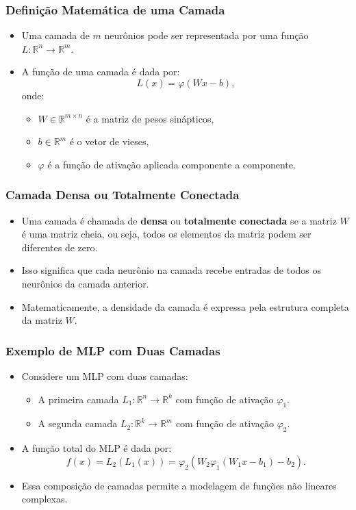 \documentclass{beamer}
\begin{document}
\begin{frame}
\frametitle{Definição Matemática de uma Camada}
\begin{itemize}
    \item Uma camada de \( m \) neurônios pode ser representada por uma função \( L: \mathbb{R}^n \to \mathbb{R}^m \).
    \item A função de uma camada é dada por:
    \[
    L(x) = \varphi(Wx - b),
    \]
    onde:
    \begin{itemize}
        \item \( W \in \mathbb{R}^{m \times n} \) é a matriz de pesos sinápticos,
        \item \( b \in \mathbb{R}^m \) é o vetor de vieses,
        \item \( \varphi \) é a função de ativação aplicada componente a componente.
    \end{itemize}
\end{itemize}
\end{frame}

\begin{frame}
\frametitle{Camada Densa ou Totalmente Conectada}
\begin{itemize}
    \item Uma camada é chamada de \textbf{densa} ou \textbf{totalmente conectada} se a matriz \( W \) é uma matriz cheia, ou seja, todos os elementos da matriz podem ser diferentes de zero.
    \item Isso significa que cada neurônio na camada recebe entradas de todos os neurônios da camada anterior.
    \item Matematicamente, a densidade da camada é expressa pela estrutura completa da matriz \( W \).
\end{itemize}
\end{frame}

\begin{frame}
\frametitle{Exemplo de MLP com Duas Camadas}
\begin{itemize}
    \item Considere um MLP com duas camadas:
    \begin{itemize}
        \item A primeira camada \( L_1: \mathbb{R}^n \to \mathbb{R}^k \) com função de ativação \( \varphi_1 \).
        \item A segunda camada \( L_2: \mathbb{R}^k \to \mathbb{R}^m \) com função de ativação \( \varphi_2 \).
    \end{itemize}
    \item A função total do MLP é dada por:
    \[
    f(x) = L_2(L_1(x)) = \varphi_2(W_2 \varphi_1(W_1 x - b_1) - b_2).
    \]
    \item Essa composição de camadas permite a modelagem de funções não lineares complexas.
\end{itemize}
\end{frame}
\end{document}

